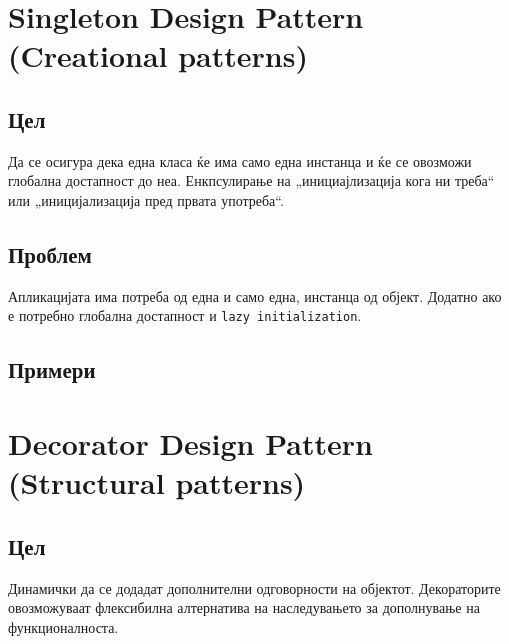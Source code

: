 

\lfoot{}
\cfoot{\thepage}
\rfoot{}
\usepackage{fancyvrb}
\usepackage{xcolor}
\usepackage{textcomp}




\section{Singleton Design Pattern (Creational patterns)}

\subsection{Цел}

Да се осигура дека една класа ќе има само една инстанца и ќе се овозможи
глобална достапност до неа. Енкпсулирање на „инициајлизација кога ни треба“ или
„иницијализација пред првата употреба“.

\subsection{Проблем}

Апликацијата има потреба од една и само една, инстанца од објект. Додатно ако е
потребно глобална достапност и \texttt{lazy initialization}.

\subsection{Примери}









\section{Decorator Design Pattern (Structural patterns)}

\subsection{Цел}

Динамички да се додадат дополнителни одговорности на објектот. Декораторите
овозможуваат флексибилна алтернатива на наследувањето за дополнување на
функционалноста.

